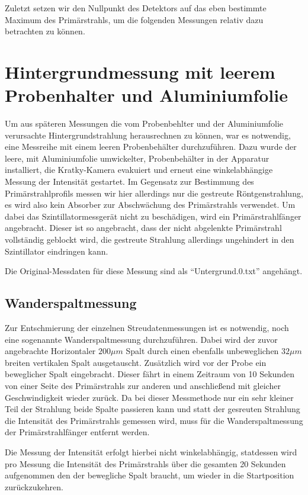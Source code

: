 \documentclass[bigchapter,colorback,accentcolor=tud4b,linedtoc,11pt]{tudreport}
\begin{document}
Zuletzt setzen wir den Nullpunkt des Detektors auf das eben bestimmte Maximum des Primärstrahls, um die folgenden Messungen relativ dazu betrachten zu können.

\section{Hintergrundmessung mit leerem Probenhalter und Aluminiumfolie}
Um aus späteren Messungen die vom Probenbehlter und der Aluminiumfolie verursachte Hintergrundstrahlung herausrechnen zu können, war es notwendig, eine Messreihe mit einem leeren Probenbehälter durchzuführen. Dazu wurde der leere, mit Aluminiumfolie umwickelter, Probenbehälter in der Apparatur installiert, die Kratky-Kamera evakuiert und erneut eine winkelabhängige Messung der Intensität gestartet. Im Gegensatz zur Bestimmung des Primärstrahlprofils messen wir hier allerdings nur die gestreute Röntgenstrahlung, es wird also kein Absorber zur Abschwächung des Primärstrahls verwendet. Um dabei das Szintillatormessgerät nicht zu beschädigen, wird ein Primärstrahlfänger angebracht. Dieser ist so angebracht, dass der nicht abgelenkte Primärstrahl vollständig geblockt wird, die gestreute Strahlung allerdings ungehindert in den Szintillator eindringen kann.

Die Original-Messdaten für diese Messung sind als "`Untergrund.0.txt"' angehängt.

\subsection{Wanderspaltmessung}
Zur Entschmierung der einzelnen Streudatenmessungen ist es notwendig, noch eine sogenannte Wanderspaltmessung durchzuführen. Dabei wird der zuvor angebrachte Horizontaler $200\mu m$ Spalt durch einen ebenfalls unbeweglichen $32 \mu m$ breiten vertikalen Spalt ausgetauscht. Zusätzlich wird vor der Probe ein beweglicher Spalt eingebracht. Dieser fährt in einem Zeitraum von 10 Sekunden von einer Seite des Primärstrahls zur anderen und anschließend mit gleicher Geschwindigkeit wieder zurück. Da bei dieser Messmethode nur ein sehr kleiner Teil der Strahlung beide Spalte passieren kann und statt der gesreuten Strahlung die Intensität des Primärstrahls gemessen wird, muss für die Wanderspaltmessung der Primärstrahlfänger entfernt werden.

Die Messung der Intensität erfolgt hierbei nicht winkelabhängig, statdessen wird pro Messung die Intensität des Primärstrahls über die gesamten 20 Sekunden aufgenommen den der bewegliche Spalt braucht, um wieder in die Startposition zurückzukehren.
\end{document}
